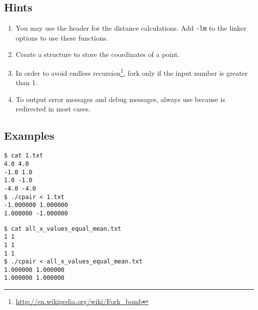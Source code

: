 \clearpage
\subsection*{Hints}
\begin{enumerate}
\item You may use the header  for the distance calculations.
Add \verb|-lm| to the linker options to use these functions.
\item Create a structure to store the coordinates of a point.
\item In order to avoid endless recursion\footnote{\url{http://en.wikipedia.org/wiki/Fork\_bomb}},
fork only if the input number is greater than 1.
\item To output error messages and debug messages, always use
 because  is redirected in most cases.
\end{enumerate}

\subsection*{Examples}
\begin{multicols}{2}
\begin{verbatim}
$ cat 1.txt
4.0 4.0
-1.0 1.0
1.0 -1.0
-4.0 -4.0
$ ./cpair < 1.txt
-1.000000 1.000000
1.000000 -1.000000
\end{verbatim}
\begin{verbatim}
$ cat all_x_values_equal_mean.txt
1 1
1 1
1 1
$ ./cpair < all_x_values_equal_mean.txt
1.000000 1.000000
1.000000 1.000000
\end{verbatim}
\end{multicols}



\osueguidelinestwo



